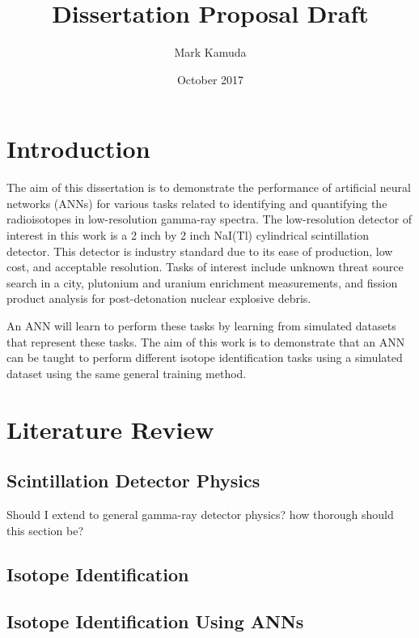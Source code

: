 \documentclass[10pt,letterpaper]{article}
\begin{document}
\tableofcontents


\title{Dissertation Proposal Draft}
\author{Mark Kamuda}
\date{October 2017}
\maketitle


\section{Introduction}

The aim of this dissertation is to demonstrate the performance of artificial neural networks (ANNs) for various tasks related to identifying and quantifying the radioisotopes in low-resolution gamma-ray spectra. The low-resolution detector of interest in this work is a 2 inch by 2 inch NaI(Tl) cylindrical scintillation detector. This detector is industry standard due to its ease of production, low cost, and acceptable resolution. Tasks of interest include unknown threat source search in a city, plutonium and uranium enrichment measurements, and fission product analysis for post-detonation nuclear explosive debris. 

An ANN will learn to perform these tasks by learning from simulated datasets that represent these tasks. The aim of this work is to demonstrate that an ANN can be taught to perform different isotope identification tasks using a simulated dataset using the same general training method.


\section{Literature Review}


\subsection{Scintillation Detector Physics}

Should I extend to general gamma-ray detector physics? how thorough should this section be?


\subsection{Isotope Identification}

\subsection{Isotope Identification Using ANNs}
\end{document}
